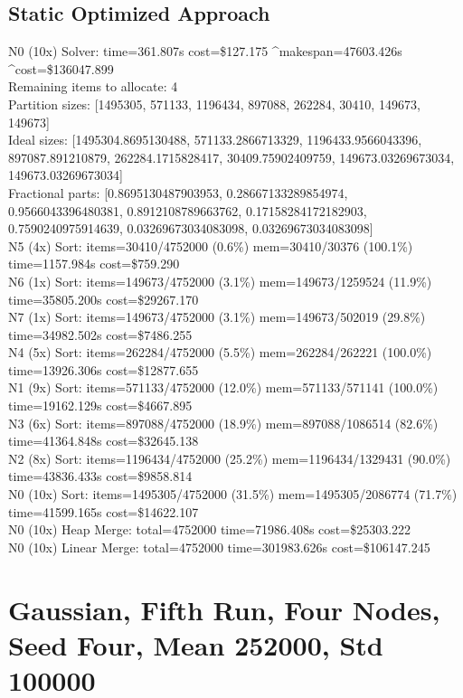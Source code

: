 \documentclass[]{interact}
\theoremstyle{plain}
\theoremstyle{definition}
\theoremstyle{remark}
\begin{document}
\subsection{Static Optimized Approach}
N0 (10x) Solver: time=361.807\textmu s cost=\$127.175 \^{}makespan=47603.426\textmu s \^{}cost=\$136047.899\\
Remaining items to allocate: 4\\
Partition sizes: [1495305, 571133, 1196434, 897088, 262284, 30410, 149673, 149673]\\
Ideal sizes: [1495304.8695130488, 571133.2866713329, 1196433.9566043396, 897087.891210879, 262284.1715828417, 30409.75902409759, 149673.03269673034, 149673.03269673034]\\
Fractional parts: [0.8695130487903953, 0.28667133289854974, 0.9566043396480381, 0.8912108789663762, 0.17158284172182903, 0.7590240975914639, 0.03269673034083098, 0.03269673034083098]\\
N5 (4x) Sort: items=30410/4752000 (0.6\%) mem=30410/30376 (100.1\%) time=1157.984\textmu s cost=\$759.290\\
N6 (1x) Sort: items=149673/4752000 (3.1\%) mem=149673/1259524 (11.9\%) time=35805.200\textmu s cost=\$29267.170\\
N7 (1x) Sort: items=149673/4752000 (3.1\%) mem=149673/502019 (29.8\%) time=34982.502\textmu s cost=\$7486.255\\
N4 (5x) Sort: items=262284/4752000 (5.5\%) mem=262284/262221 (100.0\%) time=13926.306\textmu s cost=\$12877.655\\
N1 (9x) Sort: items=571133/4752000 (12.0\%) mem=571133/571141 (100.0\%) time=19162.129\textmu s cost=\$4667.895\\
N3 (6x) Sort: items=897088/4752000 (18.9\%) mem=897088/1086514 (82.6\%) time=41364.848\textmu s cost=\$32645.138\\
N2 (8x) Sort: items=1196434/4752000 (25.2\%) mem=1196434/1329431 (90.0\%) time=43836.433\textmu s cost=\$9858.814\\
N0 (10x) Sort: items=1495305/4752000 (31.5\%) mem=1495305/2086774 (71.7\%) time=41599.165\textmu s cost=\$14622.107\\
N0 (10x) Heap Merge: total=4752000 time=71986.408\textmu s cost=\$25303.222\\
N0 (10x) Linear Merge: total=4752000 time=301983.626\textmu s cost=\$106147.245

\clearpage

\section{Gaussian, Fifth Run, Four Nodes, Seed Four, Mean 252000, Std 100000}
\end{document}
